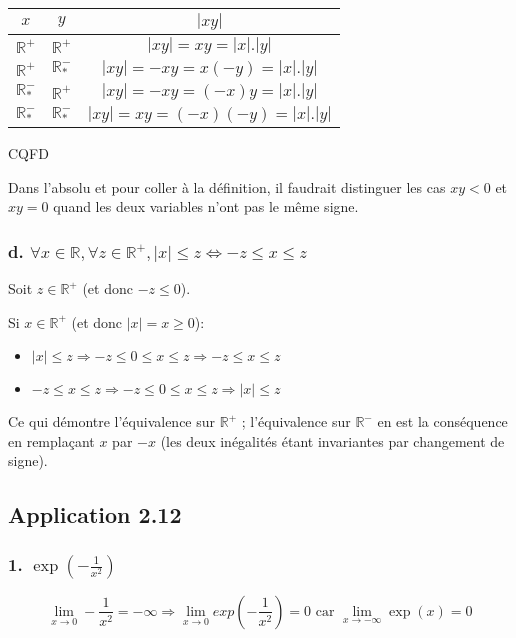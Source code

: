 \documentclass[a4paper,10pt]{report}
\begin{document}
\begin{tabular}{|c|c|c|}
	\hline
	$x$                  & $y$                  & $|xy|$\\
	\hline
	$\mathbb{R}^{+}$     & $\mathbb{R}^{+}$     & $|xy| = xy = |x|.|y|$ \\
	\hline
	$\mathbb{R}^{+}$     & $\mathbb{R}^{-}_{*}$ & $|xy| = -xy = x(-y) = |x|.|y|$ \\
	\hline
	$\mathbb{R}^{-}_{*}$ & $\mathbb{R}^{+}$     & $|xy| = -xy = (-x)y = |x|.|y|$ \\
	\hline
	$\mathbb{R}^{-}_{*}$ & $\mathbb{R}^{-}_{*}$ & $|xy| = xy =(-x)(-y) = |x|.|y|$ \\
	\hline
\end{tabular}

CQFD

Dans l'absolu et pour coller à la définition, il faudrait distinguer les cas $xy<0$ et $xy=0$ quand les deux variables n'ont pas
le même signe.


\subsubsection*{d. $\forall x \in \mathbb{R}, \forall z \in \mathbb{R}^{+}, |x| \leq z \Longleftrightarrow -z \leq x \leq z$}

Soit $z \in \mathbb{R}^{+}$ (et donc $-z \leq 0$).

Si $x \in \mathbb{R}^{+}$ (et donc $|x|=x \geq 0$):

\begin{itemize}
	\item $|x| \leq z \Longrightarrow -z \leq 0 \leq x \leq z \Longrightarrow -z \leq x \leq z$
	\item $-z \leq x \leq z \Longrightarrow -z \leq 0 \leq x \leq z \Longrightarrow |x| \leq z$
\end{itemize}

Ce qui démontre l'équivalence sur $\mathbb{R}^{+}$ ; l'équivalence sur $\mathbb{R}^{-}$ en est la conséquence
en remplaçant $x$ par $-x$ (les deux inégalités étant invariantes par changement de signe).

\subsection*{Application 2.12}

\subsubsection*{1. $\exp(-\frac{1}{x^2})$}
\begin{displaymath}
	\lim_{x \rightarrow 0} -\frac{1}{x^2} =-\infty \Longrightarrow 	\lim_{x \rightarrow 0} exp(-\frac{1}{x^2})= 0 \text{ car } \lim_{x \rightarrow -\infty} \exp(x) = 0
\end{displaymath}
\end{document}

